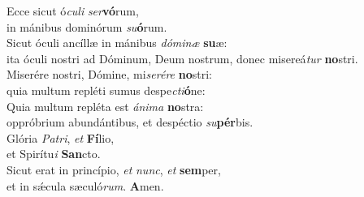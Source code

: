 \evenverse Ecce sicut ó\textit{cu}\textit{li} \textit{ser}\textbf{vó}rum,~\*\\
\evenverse in mánibus dominórum \textit{su}\textbf{ó}rum.\\
\oddverse Sicut óculi ancíllæ in mánibus \textit{dó}\textit{mi}\textit{næ} \textbf{su}æ:~\*\\
\oddverse ita óculi nostri ad Dóminum, Deum nostrum, donec misereá\textit{tur} \textbf{no}stri.\\
\evenverse Miserére nostri, Dómine, mi\textit{se}\textit{ré}\textit{re} \textbf{no}stri:~\*\\
\evenverse quia multum repléti sumus despe\textit{cti}\textbf{ó}ne:\\
\oddverse Quia multum repléta est \textit{á}\textit{ni}\textit{ma} \textbf{no}stra:~\*\\
\oddverse oppróbrium abundántibus, et despéctio \textit{su}\textbf{pér}bis.\\
\evenverse Glória \textit{Pa}\textit{tri}, \textit{et} \textbf{Fí}lio,~\*\\
\evenverse et Spirítu\textit{i} \textbf{San}cto.\\
\oddverse Sicut erat in princípio, \textit{et} \textit{nunc}, \textit{et} \textbf{sem}per,~\*\\
\oddverse et in sǽcula sæculó\textit{rum}. \textbf{A}men.\\
